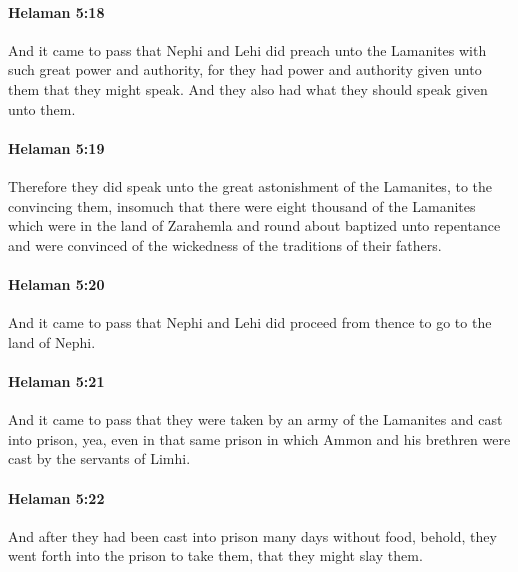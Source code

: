 		\paragraph{Helaman 5:18} %
			\label{HELAMAN-5-18}

			And it came to pass that Nephi and Lehi did preach unto the Lamanites
			with such great power and authority,
			for they had power and authority given unto them that they might speak.
			And they also had what they should speak given unto them.

		\paragraph{Helaman 5:19} %
			\label{HELAMAN-5-19}

			Therefore they did speak unto the great astonishment of the Lamanites,
			to the convincing them,
			insomuch that there were eight thousand of the Lamanites
			which were in the land of Zarahemla and round about
			baptized unto repentance
			and were convinced of the wickedness of the traditions of their fathers.

		\paragraph{Helaman 5:20} %
			\label{HELAMAN-5-20}

			And it came to pass that
			Nephi and Lehi did proceed from thence to go to the land of Nephi.

		\paragraph{Helaman 5:21} %
			\label{HELAMAN-5-21}

			And it came to pass that
			they were taken by an army of the Lamanites and cast into prison,
			yea, even in that same prison
			in which Ammon and his brethren were cast by the servants of Limhi.

		\paragraph{Helaman 5:22} %
			\label{HELAMAN-5-22}

			And after they had been cast into prison many days without food,
			behold, they went forth into the prison to take them,
			that they might slay them.

